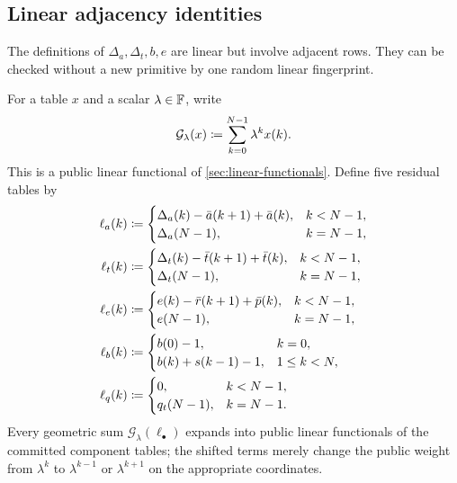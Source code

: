 \subsection{Linear adjacency identities}
\label{sec:memory-linear-identities}

The definitions of $\Delta_a,\Delta_t,b,e$ are linear but involve adjacent rows.  They can be checked without a new primitive by one random linear fingerprint.

For a table $x$ and a scalar $\lambda\in\mathbb{F}$, write
\begin{equation}
  \mathcal G_\lambda(x)
  \coloneqq
  \sum_{k=0}^{N-1}\lambda^k x(k).
  \label{eq:memory-geometric-functional}
\end{equation}
This is a public linear functional of \cref{sec:linear-functionals}.  Define five residual tables by
\begin{align}
  \ell_a(k)
  &\coloneqq
  \begin{cases}
    \Delta_a(k)-\bar a(k+1)+\bar a(k),&k<N-1,\\
    \Delta_a(N-1),&k=N-1,
  \end{cases}
  \label{eq:memory-residual-a}\\
  \ell_t(k)
  &\coloneqq
  \begin{cases}
    \Delta_t(k)-\bar t(k+1)+\bar t(k),&k<N-1,\\
    \Delta_t(N-1),&k=N-1,
  \end{cases}
  \label{eq:memory-residual-t}\\
  \ell_e(k)
  &\coloneqq
  \begin{cases}
    e(k)-\bar r(k+1)+\bar p(k),&k<N-1,\\
    e(N-1),&k=N-1,
  \end{cases}
  \label{eq:memory-residual-e}\\
  \ell_b(k)
  &\coloneqq
  \begin{cases}
    b(0)-1,&k=0,\\
    b(k)+s(k-1)-1,&1\le k<N,
  \end{cases}
  \label{eq:memory-residual-b}\\
  \ell_q(k)
  &\coloneqq
  \begin{cases}
    0,&k<N-1,\\
    q_t(N-1),&k=N-1.
  \end{cases}
  \label{eq:memory-residual-q}
\end{align}
Every geometric sum $\mathcal G_\lambda(\ell_\bullet)$ expands into public linear functionals of the committed component tables; the shifted terms merely change the public weight from $\lambda^k$ to $\lambda^{k-1}$ or $\lambda^{k+1}$ on the appropriate coordinates.


